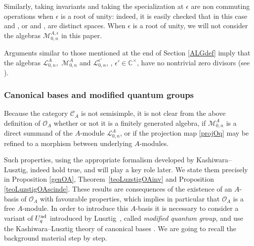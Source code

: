 \documentclass[10pt,a4paper]{amsart}
\numberwithin{equation}{section}
\theoremstyle{definition}
\newcommand{\e}{\epsilon}
\newcommand{\ep}{{\epsilon'}}
\newcommand{\mc}{\mathbb{C}}
\newcommand{\Ll}{{\mathcal L}}
\newcommand{\Mm}{{\mathcal M}}
\newcommand{\Oo}{{\mathcal O}}
\begin{document}
Similarly, taking invariants and taking the specialization at $\e$ are non commuting operations when $\e$ is a root of unity: indeed, it is easily checked that in this case \smash{$\big(U_A^{\otimes n}\big)^{U_A}_\e$} and \smash{$\big(U_\e^{\otimes n}\big)^{U_\e}$}, or \smash{$\Mm_{0,n}^{A,\e} = \Mm_{0,n}^A \bigotimes_A \mc_\e$} and \smash{$\big(\Ll_{0,n}^\e\big)^{U_\e}$}, are distinct spaces. When $\e$ is a root of unity, we will not consider the algebras $\Mm_{0,n}^{A,\e}$ in this paper.

Arguments similar to those mentioned at the end of Section \ref{ALGdef} imply that the algebras $\Ll_{0,n}^A$,~$\Mm_{0,n}^A$ and $\Ll_{0,n}^\ep$, \smash{$\Mm_{0,n}^{A,\ep}$}, $\ep\in \mc^\times$, have no nontrivial zero divisors (see \cite[Propositions~6.11 and~6.30]{BR}).

\subsubsection{Canonical bases and modified quantum groups} \label{canbasemodqg} Because the category $\mathcal{C}_A$ is not semisimple, it is not clear from the above definition of $\Oo_A$ whether or not it is a finitely generated algebra, if $\Mm_{0,n}^A$ is a direct summand of the $A$-module $\Ll_{0,n}^A$, or if the projection map \eqref{projOq} may be refined to a morphism between underlying $A$-modules.

Such properties, using the appropriate formalism developed by Kashiwara--Lusztig, indeed hold true, and will play a key role later. We state them precisely in Proposition \ref{genOA}, Theorem~\ref{teoLuzstigOAinv} and Proposition \ref{teoLuzstigOAscinde}. These results are consequences of the existence of an $A$-basis of $\Oo_A$ with favourable properties, which implies in particular that $\Oo_A$ is a free $A$-module. In order to introduce this $A$-basis it is necessary to consider a variant of $U_q^{\rm ad}$ introduced by Lusztig~\cite{Lusztig}, called {\it modified quantum group}, and use the Kashiwara--Lusztig theory of canonical bases \cite{Kashiwara1,Kashiwara2,Kashiwara3,Lusztig}. We are going to recall the background material step by step.
\end{document}
